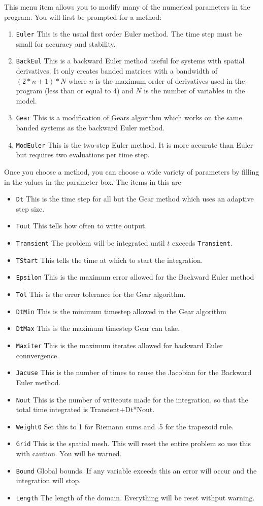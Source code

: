 This menu item allows you to modify many of the numerical parameters
in the program. You will first be prompted for a method:
\begin{enumerate}
\item {\tt Euler} This is the usual first order Euler method. The time
step must be small for accuracy and stability.
\item {\tt BackEul}  This is a backward Euler method useful for
systems with spatial derivatives.  It only creates banded matrices
with a bandwidth of $(2*n+1)*N$ where $n$ is the maximum order of
derivatives used in the program (less than or equal to 4) and $N$ is
the number of variables in the model.
\item {\tt Gear} This is a modification of Gears algorithm which works
on the same banded systems as the backward Euler method.
\item {\tt ModEuler} This is the two-step Euler method.  It is more
accurate than Euler but requires two evaluations per time step.
\end{enumerate}

Once you choose a method, you can choose a wide variety of parameters
by filling in the values in the parameter box.  The items in this are
\begin{itemize}
\item {\tt Dt} This is the time step for all but the Gear method which
uses an adaptive step size.
\item {\tt Tout} This tells \xtc how often to write output.
\item {\tt Transient}  The problem will be integrated until $t$
exceeds {\tt Transient}.
\item {\tt TStart} This tells \xtc the time at which to start the
integration.
\item {\tt Epsilon}  This is the maximum error allowed for the
Backward Euler method
\item {\tt Tol} This is the error tolerance for the Gear algorithm.
\item {\tt DtMin} This is the minimum timestep allowed in the Gear
algorithm
\item {\tt DtMax} This is the maximum timestep Gear can take.
\item {\tt Maxiter} This is the maximum iterates allowed for backward
Euler connvergence.
\item {\tt Jacuse} This is the number of times to reuse the Jacobian
for the Backward Euler method.
\item {\tt Nout} This is the number of writeouts made for the
integration, so that the total time integrated is Transient+Dt*Nout.
\item {\tt Weight0} Set this to 1 for Riemann sums and .5 for the
trapezoid rule.
\item {\tt Grid} This is the spatial mesh.  This will reset the entire
problem so use this with caution.  You will be warned.
\item {\tt Bound} Global bounds.  If any variable exceeds this an
error will occur and the integration will stop.
\item {\tt Length} The length of the domain.  Everything will be reset
withput warning.
\end{itemize}

